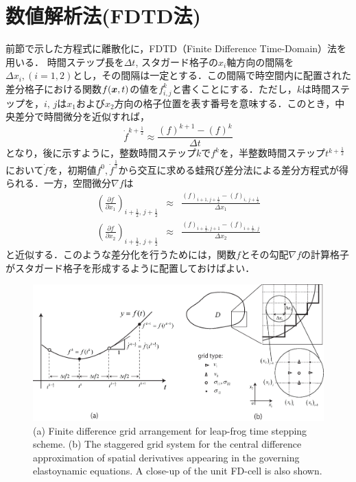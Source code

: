\section{数値解析法(FDTD法)}
前節で示した方程式に離散化に，FDTD（Finite Difference Time-Domain）法を用いる．
時間ステップ長を$\Delta t$, スタガード格子の$x_i$軸方向の間隔を
$\Delta x_i,(i=1,2)$とし，その間隔は一定とする．この間隔で時空間内に配置された差分格子における関数$f(\mbox{\boldmath $x$},t)$の値を$f^k_{i,j}$と書くことにする．ただし，$k$は時間ステップを，$i,\, j$は$x_1$および$x_2$方向の格子位置を表す番号を意味する．このとき，中央差分で時間微分を近似すれば，
\begin{equation}
	\dot{f}^{k+\frac{1}{2}} \approx \frac{ (f)^{k+1}-(f)^k}{\Delta t}
	\label{eqn:dfdt}
\end{equation}
となり，後に示すように，整数時間ステップ$k$で$f^k$を，半整数時間ステップ$t^{k+\frac{1}{2}}$において$\dot f$を，初期値$f^0, \dot f^{\frac{1}{2}}$から交互に求める蛙飛び差分法による差分方程式が得られる．一方，空間微分$\nabla f$は
\begin{eqnarray}
	\left( \frac{\partial f}{\partial x_1}\right)
	_{i+\frac{1}{2}, \, j+\frac{1}{2}}
	& \approx &
		\frac{\left(f\right)_{i+1,j+\frac{1}{2}} -\left(f\right)_{i,\, j+\frac{1}{2}}}
		{\Delta x_1}
	\label{eqn:dfdx1}
	\\
	\left( \frac{\partial f}{\partial x_2}\right)
	_{i+\frac{1}{2}, \, j+\frac{1}{2}}
	& \approx &
	\frac{\left(f\right)_{i+\frac{1}{2},j+1} -\left(f\right)_{i+\frac{1}{2},\, j}}{\Delta x_2}
	\label{eqn:dfdx2}
\end{eqnarray}
と近似する．このような差分化を行うためには，関数$f$とその勾配$\nabla f$の計算格子がスタガード格子を形成するように配置しておけばよい．
\begin{figure}
     \begin{center}
     \includegraphics[width=1.0\linewidth]{Figs/FDgrid.eps}
     \end{center}
     \caption{ (a) Finite difference grid arrangement for leap-frog time stepping scheme.
	 (b) The staggered grid system for the central difference approximation 
		of spatial derivatives appearing in the governing elastoynamic 
		equations. A close-up of the unit FD-cell is also shown.
	}
     \label{fig:FDgrids}
\end{figure}
